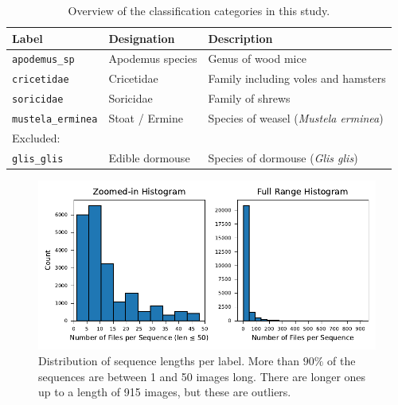     \begin{table}[ht]
    \centering
    \caption{Overview of the classification categories in this study.}
    \label{tab:class_labels}
    \begin{tabular}{lll}
    \toprule
    \textbf{Label} & \textbf{Designation} & \textbf{Description} \\
    \midrule
    \texttt{apodemus\_sp}     & Apodemus species        & Genus of wood mice \\
    \texttt{cricetidae}       & Cricetidae              & Family including voles and hamsters \\
    \texttt{soricidae}        & Soricidae               & Family of shrews \\
    \texttt{mustela\_erminea} & Stoat / Ermine          & Species of weasel (\textit{Mustela erminea}) \\
    \midrule
    \multicolumn{3}{l}{Excluded:} \\
    \texttt{glis\_glis}       & Edible dormouse         & Species of dormouse (\textit{Glis glis}) \\
    \bottomrule
    \end{tabular}
    \end{table}

    \begin{figure}[ht]
    \centering
    \includegraphics{figures/seq_len_histograms.pdf}
    \caption{Distribution of sequence lengths per label. More than \(90\%\) of the sequences are between 1 and 50 images long. There are longer ones up to a length of 915 images, but these are outliers.}
    \label{fig:seq_len_histograms}
    \end{figure}


